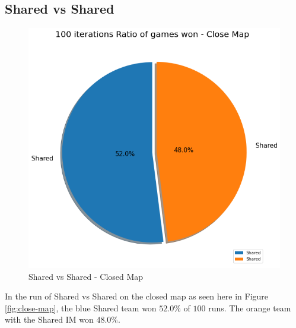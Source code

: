 \documentclass[]{report}
\begin{document}
		\subsection{Shared vs Shared}
		\begin{figure}[h!]
			\centering
			\includegraphics[width=0.9\linewidth]{"Images/100 Games Shared vs Shared Close Map"}
			\caption[Shared vs Shared - Closed Map]{Shared vs Shared - Closed Map}
			\label{fig:100-games-shared-vs-shared-close-map}
		\end{figure}
		In the run of Shared vs Shared on the closed map as seen here in Figure \ref{fig:close-map}, the blue Shared team won $52.0\%$ of $100$ runs. The orange team with the Shared \ac{IM} won $48.0\%$.
		
		\clearpage\clearpage
\end{document}
